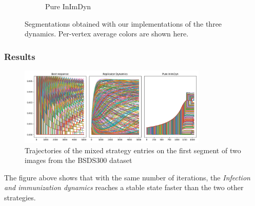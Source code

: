 \documentclass{beamer}
\begin{document}
\begin{frame}
\begin{figure}
\begin{subfigure}[b]{0.23\textwidth}
            \caption{Pure InImDyn}
        \end{subfigure}
           \caption{Segmentations obtained with our implementations of the three dynamics. Per-vertex average colors are shown here.}
           \label{fig:results-dynamics}
    \end{figure}
\end{frame}

\begin{frame}
    \frametitle{Results}
    \begin{figure}
        \centering
        \includegraphics[width=0.8\textwidth]{../figures/trajectories/102061.png}
        \caption{Trajectories of the mixed strategy entries on the first segment of two images from the BSDS300 dataset}
        \label{fig:trajectories}
    \end{figure}
    The figure above shows that with the same number of iterations, the \textit{Infection and immunization dynamics} reaches a stable state faster than the two other strategies.
\end{frame}
\end{document}
